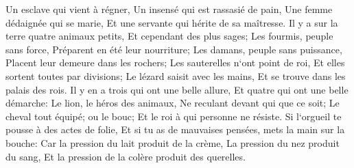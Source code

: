 \verse Un esclave qui vient à régner, Un insensé qui est rassasié de pain, 
\verse Une femme dédaignée qui se marie, Et une servante qui hérite de sa maîtresse. 
\verse Il y a sur la terre quatre animaux petits, Et cependant des plus sages; 
\verse Les fourmis, peuple sans force, Préparent en été leur nourriture; 
\verse Les damans, peuple sans puissance, Placent leur demeure dans les rochers; 
\verse Les sauterelles n`ont point de roi, Et elles sortent toutes par divisions; 
\verse Le lézard saisit avec les mains, Et se trouve dans les palais des rois. 
\verse Il y en a trois qui ont une belle allure, Et quatre qui ont une belle démarche: 
\verse Le lion, le héros des animaux, Ne reculant devant qui que ce soit; 
\verse Le cheval tout équipé; ou le bouc; Et le roi à qui personne ne résiste. 
\verse Si l`orgueil te pousse à des actes de folie, Et si tu as de mauvaises pensées, mets la main sur la bouche: 
\verse Car la pression du lait produit de la crème, La pression du nez produit du sang, Et la pression de la colère produit des querelles. 

